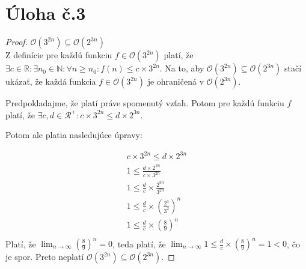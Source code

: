 \documentclass[10pt]{article}
\begin{document}
\section*{Úloha č.3}
\begin{proof}
$\mathcal{O}(3^{2n}) \subseteq \mathcal{O}(2^{3n})$ \\
Z definície pre každú funkciu $f \in \mathcal{O}(3^{2n})$ platí, že $\exists c \in \mathbb{R}: \exists n_0 \in \mathbb{N}: \forall n \geq n_0: f(n) \leq c\times 3^{2n}$.  
Na to, aby $\mathcal{O}(3^{2n}) \subseteq \mathcal{O}(2^{3n})$ stačí ukázať, že každá funkcia $f \in \mathcal{O}(3^{2n})$ je ohraničená v $\mathcal{O}(2^{3n})$.

Predpokladajme, že platí práve spomenutý vzťah. Potom pre každú funkciu $f$ platí, že $\exists c,d \in \mathcal{R}^+: c \times 3^{2n} \leq d \times 2^{3n}$. 

Potom ale platia nasledujúce úpravy:

\begin{align*}
    c \times 3^{2n} \leq d \times 2^{3n}  \\
    1 \leq \frac{d \times 2^{3n}}{c \times 3^{2n}} \\
    1 \leq \frac{d}{c} \times \frac{2^{3n}}{3^{2n}} \\
    1 \leq \frac{d}{c} \times (\frac{2^{3}}{3^{2}})^n \\
    1 \leq \frac{d}{c} \times (\frac{8}{9})^n \\
\end{align*}
Platí, že $\lim_{n \to \infty} (\frac{8}{9})^n = 0$, teda platí, že $\lim_{n \to \infty} 1 \leq \frac{d}{c} \times (\frac{8}{9})^n  = 1 < 0$, čo je spor.
Preto neplatí $\mathcal{O}(3^{2n}) \subseteq \mathcal{O}(2^{3n})$.
\end{proof}
\end{document}
